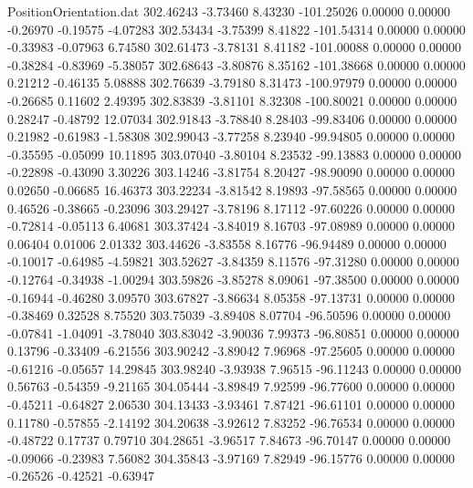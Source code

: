 \begin{filecontents}{PositionOrientation.dat}
 302.46243   -3.73460    8.43230  -101.25026    0.00000    0.00000   -0.26970   -0.19575   -4.07283
 302.53434   -3.75399    8.41822  -101.54314    0.00000    0.00000   -0.33983   -0.07963    6.74580
 302.61473   -3.78131    8.41182  -101.00088    0.00000    0.00000   -0.38284   -0.83969   -5.38057
 302.68643   -3.80876    8.35162  -101.38668    0.00000    0.00000    0.21212   -0.46135    5.08888
 302.76639   -3.79180    8.31473  -100.97979    0.00000    0.00000   -0.26685    0.11602    2.49395
 302.83839   -3.81101    8.32308  -100.80021    0.00000    0.00000    0.28247   -0.48792   12.07034
 302.91843   -3.78840    8.28403   -99.83406    0.00000    0.00000    0.21982   -0.61983   -1.58308
 302.99043   -3.77258    8.23940   -99.94805    0.00000    0.00000   -0.35595   -0.05099   10.11895
 303.07040   -3.80104    8.23532   -99.13883    0.00000    0.00000   -0.22898   -0.43090    3.30226
 303.14246   -3.81754    8.20427   -98.90090    0.00000    0.00000    0.02650   -0.06685   16.46373
 303.22234   -3.81542    8.19893   -97.58565    0.00000    0.00000    0.46526   -0.38665   -0.23096
 303.29427   -3.78196    8.17112   -97.60226    0.00000    0.00000   -0.72814   -0.05113    6.40681
 303.37424   -3.84019    8.16703   -97.08989    0.00000    0.00000    0.06404    0.01006    2.01332
 303.44626   -3.83558    8.16776   -96.94489    0.00000    0.00000   -0.10017   -0.64985   -4.59821
 303.52627   -3.84359    8.11576   -97.31280    0.00000    0.00000   -0.12764   -0.34938   -1.00294
 303.59826   -3.85278    8.09061   -97.38500    0.00000    0.00000   -0.16944   -0.46280    3.09570
 303.67827   -3.86634    8.05358   -97.13731    0.00000    0.00000   -0.38469    0.32528    8.75520
 303.75039   -3.89408    8.07704   -96.50596    0.00000    0.00000   -0.07841   -1.04091   -3.78040
 303.83042   -3.90036    7.99373   -96.80851    0.00000    0.00000    0.13796   -0.33409   -6.21556
 303.90242   -3.89042    7.96968   -97.25605    0.00000    0.00000   -0.61216   -0.05657   14.29845
 303.98240   -3.93938    7.96515   -96.11243    0.00000    0.00000    0.56763   -0.54359   -9.21165
 304.05444   -3.89849    7.92599   -96.77600    0.00000    0.00000   -0.45211   -0.64827    2.06530
 304.13433   -3.93461    7.87421   -96.61101    0.00000    0.00000    0.11780   -0.57855   -2.14192
 304.20638   -3.92612    7.83252   -96.76534    0.00000    0.00000   -0.48722    0.17737    0.79710
 304.28651   -3.96517    7.84673   -96.70147    0.00000    0.00000   -0.09066   -0.23983    7.56082
 304.35843   -3.97169    7.82949   -96.15776    0.00000    0.00000   -0.26526   -0.42521   -0.63947

\end{filecontents}
